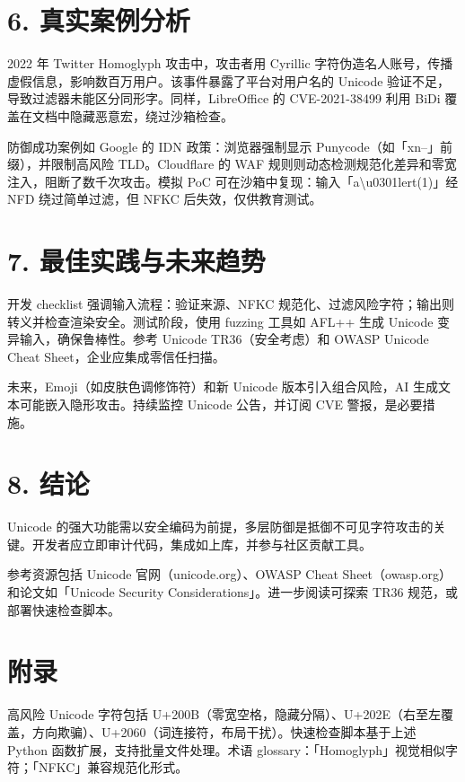 \chapter{6. 真实案例分析}
2022 年 Twitter Homoglyph 攻击中，攻击者用 Cyrillic 字符伪造名人账号，传播虚假信息，影响数百万用户。该事件暴露了平台对用户名的 Unicode 验证不足，导致过滤器未能区分同形字。同样，LibreOffice 的 CVE-2021-38499 利用 BiDi 覆盖在文档中隐藏恶意宏，绕过沙箱检查。\par
防御成功案例如 Google 的 IDN 政策：浏览器强制显示 Punycode（如「xn--」前缀），并限制高风险 TLD。Cloudflare 的 WAF 规则则动态检测规范化差异和零宽注入，阻断了数千次攻击。模拟 PoC 可在沙箱中复现：输入「a\textbackslash{}u0301lert(1)」经 NFD 绕过简单过滤，但 NFKC 后失效，仅供教育测试。\par
\chapter{7. 最佳实践与未来趋势}
开发 checklist 强调输入流程：验证来源、NFKC 规范化、过滤风险字符；输出则转义并检查渲染安全。测试阶段，使用 fuzzing 工具如 AFL++ 生成 Unicode 变异输入，确保鲁棒性。参考 Unicode TR36（安全考虑）和 OWASP Unicode Cheat Sheet，企业应集成零信任扫描。\par
未来，Emoji（如皮肤色调修饰符）和新 Unicode 版本引入组合风险，AI 生成文本可能嵌入隐形攻击。持续监控 Unicode 公告，并订阅 CVE 警报，是必要措施。\par
\chapter{8. 结论}
Unicode 的强大功能需以安全编码为前提，多层防御是抵御不可见字符攻击的关键。开发者应立即审计代码，集成如上库，并参与社区贡献工具。\par
参考资源包括 Unicode 官网（unicode.org）、OWASP Cheat Sheet（owasp.org）和论文如「Unicode Security Considerations」。进一步阅读可探索 TR36 规范，或部署快速检查脚本。\par
\chapter{附录}
高风险 Unicode 字符包括 U+200B（零宽空格，隐藏分隔）、U+202E（右至左覆盖，方向欺骗）、U+2060（词连接符，布局干扰）。快速检查脚本基于上述 Python 函数扩展，支持批量文件处理。术语 glossary：「Homoglyph」视觉相似字符；「NFKC」兼容规范化形式。\par
